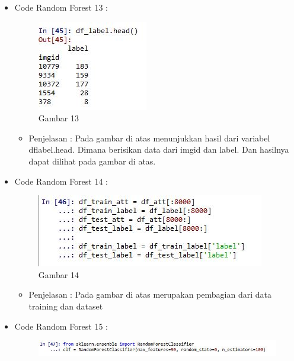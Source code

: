 \begin{enumerate}
\begin{itemize}
\begin{itemize}
\par
\par
\end{itemize}
\item Code Random Forest 13 :
\par
\begin{figure}[ht]
\centering
\includegraphics[scale=0.7]{figures/AFS/4m.jpg}
\caption{Gambar 13}
\label{contoh}
\end{figure}
\par
\begin{itemize}
\item Penjelasan : Pada gambar di atas menunjukkan hasil dari variabel dflabel.head. Dimana berisikan data dari imgid dan label. Dan hasilnya dapat dilihat pada gambar di atas.
\par
\par
\end{itemize}
\item Code Random Forest 14 :
\par
\begin{figure}[ht]
\centering
\includegraphics[scale=0.7]{figures/AFS/4n.jpg}
\caption{Gambar 14}
\label{contoh}
\end{figure}
\par
\begin{itemize}
\item Penjelasan : Pada gambar di atas merupakan pembagian dari data training dan dataset
\par
\par
\end{itemize}
\item Code Random Forest 15 :
\par
\begin{figure}[ht] 
\centering
\includegraphics[scale=0.7]{figures/AFS/4o.jpg}

\end{figure}
\end{itemize}
\end{enumerate}
